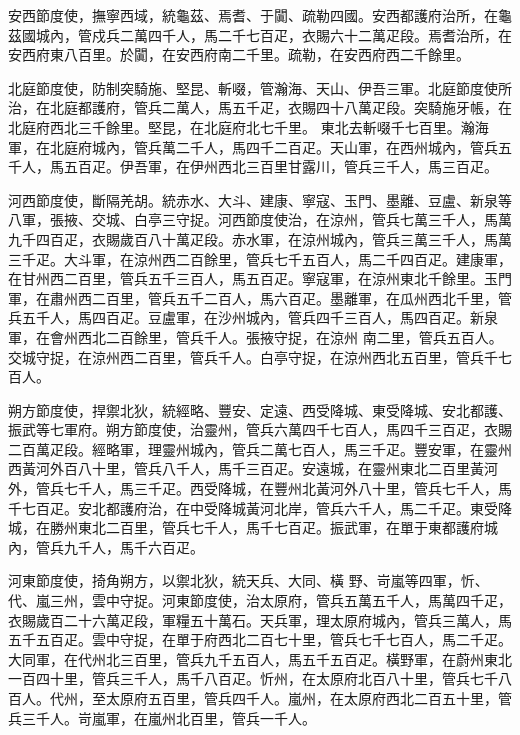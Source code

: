 \begin{pinyinscope}
 安西節度使，撫寧西域，統龜茲、焉耆、于闐、疏勒四國。安西都護府治所，在龜茲國城內，管戍兵二萬四千人，馬二千七百疋，衣賜六十二萬疋段。焉耆治所，在安西府東八百里。於闐，在安西府南二千里。疏勒，在安西府西二千餘里。



 北庭節度使，防制突騎施、堅昆、斬啜，管瀚海、天山、伊吾三軍。北庭節度使所治，在北庭都護府，管兵二萬人，馬五千疋，衣賜四十八萬疋段。突騎施牙帳，在北庭府西北三千餘里。堅昆，在北庭府北七千里。
 東北去斬啜千七百里。瀚海軍，在北庭府城內，管兵萬二千人，馬四千二百疋。天山軍，在西州城內，管兵五千人，馬五百疋。伊吾軍，在伊州西北三百里甘露川，管兵三千人，馬三百疋。



 河西節度使，斷隔羌胡。統赤水、大斗、建康、寧寇、玉門、墨離、豆盧、新泉等八軍，張掖、交城、白亭三守捉。河西節度使治，在涼州，管兵七萬三千人，馬萬九千四百疋，衣賜歲百八十萬疋段。赤水軍，在涼州城內，管兵三萬三千人，馬萬三千疋。大斗軍，在涼州西二百餘里，管兵七千五百人，馬二千四百疋。建康軍，在甘州西二百里，管兵五千三百人，馬五百疋。寧寇軍，在涼州東北千餘里。玉門軍，在肅州西二百里，管兵五千二百人，馬六百疋。墨離軍，在瓜州西北千里，管兵五千人，馬四百疋。豆盧軍，在沙州城內，管兵四千三百人，馬四百疋。新泉軍，在會州西北二百餘里，管兵千人。張掖守捉，在涼州
 南二里，管兵五百人。交城守捉，在涼州西二百里，管兵千人。白亭守捉，在涼州西北五百里，管兵千七百人。



 朔方節度使，捍禦北狄，統經略、豐安、定遠、西受降城、東受降城、安北都護、振武等七軍府。朔方節度使，治靈州，管兵六萬四千七百人，馬四千三百疋，衣賜二百萬疋段。經略軍，理靈州城內，管兵二萬七百人，馬三千疋。豐安軍，在靈州西黃河外百八十里，管兵八千人，馬千三百疋。安遠城，在靈州東北二百里黃河外，管兵七千人，馬三千疋。西受降城，在豐州北黃河外八十里，管兵七千人，馬千七百疋。安北都護府治，在中受降城黃河北岸，管兵六千人，馬二千疋。東受降城，在勝州東北二百里，管兵七千人，馬千七百疋。振武軍，在單于東都護府城內，管兵九千人，馬千六百疋。



 河東節度使，掎角朔方，以禦北狄，統天兵、大同、橫
 野、岢嵐等四軍，忻、代、嵐三州，雲中守捉。河東節度使，治太原府，管兵五萬五千人，馬萬四千疋，衣賜歲百二十六萬疋段，軍糧五十萬石。天兵軍，理太原府城內，管兵三萬人，馬五千五百疋。雲中守捉，在單于府西北二百七十里，管兵七千七百人，馬二千疋。大同軍，在代州北三百里，管兵九千五百人，馬五千五百疋。橫野軍，在蔚州東北一百四十里，管兵三千人，馬千八百疋。忻州，在太原府北百八十里，管兵七千八百人。代州，至太原府五百里，管兵四千人。嵐州，在太原府西北二百五十里，管兵三千人。岢嵐軍，在嵐州北百里，管兵一千人。




\end{pinyinscope}
